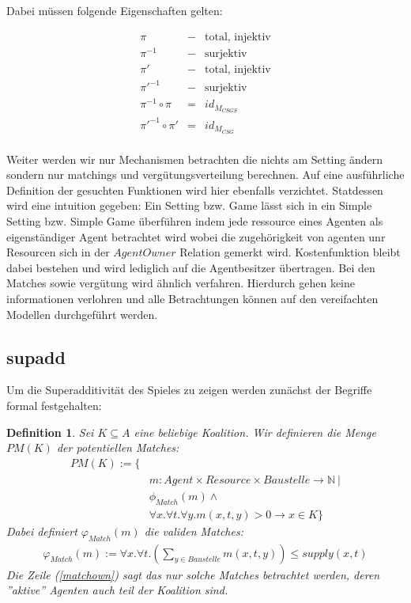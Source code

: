 \documentclass[12pt]{article}
\theoremstyle{break}
\newtheorem{definition}{Definition}
\begin{document}
Dabei müssen folgende Eigenschaften gelten:


\begin{eqnarray}
  \pi &-&\text{total, injektiv} \\
  \pi^{-1}&-&\text{surjektiv} \\
  \pi' &-&\text{total, injektiv} \\
  \pi'^{-1}&-&\text{surjektiv} \\
  \pi^{-1}\circ\pi &=& id_{M_{CSGS}} \\
  \pi'^{-1}\circ\pi' &=& id_{M_{CSG}} \\
\end{eqnarray}

Weiter werden wir nur Mechanismen betrachten die nichts am Setting ändern sondern nur matchings und vergütungsverteilung berechnen.
Auf eine ausführliche Definition der gesuchten Funktionen wird hier ebenfalls verzichtet. Statdessen wird eine intuition gegeben: Ein Setting bzw. Game lässt sich in ein Simple Setting bzw. Simple Game überführen indem jede ressource eines Agenten als eigenständiger Agent betrachtet wird wobei die zugehörigkeit von agenten unr Resourcen sich in der $AgentOwner$ Relation gemerkt wird. Kostenfunktion bleibt dabei bestehen und wird lediglich auf die Agentbesitzer übertragen. Bei den Matches sowie vergütung wird ähnlich verfahren. Hierdurch gehen keine informationen verlohren und alle Betrachtungen können auf den vereifachten Modellen durchgeführt werden.
\subsection{supadd}
\label{supadd}

Um die Superadditivität des Spieles zu zeigen werden zunächst der Begriffe formal festgehalten:

\begin{definition}
  Sei $K\subseteq A$ eine beliebige Koalition. Wir definieren die Menge $PM(K)$ der potentiellen Matches:
  \begin{eqnarray}
    PM(K) := \{ &\\
    &m: Agent\times Resource \times Baustelle \rightarrow \mathbb{N}\ |\\
    & \phi_{Match}(m) \land \\ & \forall x.\forall t.\forall y. m(x,t, y) > 0 \rightarrow x\in K\} \label{matchown}
  \end{eqnarray}
  Dabei definiert $\varphi_{Match}(m)$ die validen Matches:
  \begin{eqnarray}
    \varphi_{Match}(m) := \forall x.\forall t.(\sum_{y\in Baustelle} m(x,t,y))\leq supply(x,t)
  \end{eqnarray}
  Die Zeile (\ref{matchown}) sagt das nur solche Matches betrachtet werden, deren ''aktive'' Agenten auch teil der Koalition sind.
\end{definition}
\end{document}
